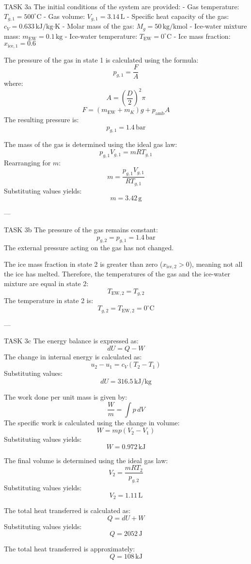 TASK 3a  
The initial conditions of the system are provided:  
- Gas temperature: \( T_{g,1} = 500^\circ\text{C} \)  
- Gas volume: \( V_{g,1} = 3.14 \, \text{L} \)  
- Specific heat capacity of the gas: \( c_V = 0.633 \, \text{kJ/kg·K} \)  
- Molar mass of the gas: \( M_g = 50 \, \text{kg/kmol} \)  
- Ice-water mixture mass: \( m_{\text{EW}} = 0.1 \, \text{kg} \)  
- Ice-water temperature: \( T_{\text{EW}} = 0^\circ\text{C} \)  
- Ice mass fraction: \( x_{\text{ice},1} = 0.6 \)  

The pressure of the gas in state 1 is calculated using the formula:  
\[
p_{g,1} = \frac{F}{A}
\]  
where:  
\[
A = \left( \frac{D}{2} \right)^2 \pi
\]  
\[
F = (m_{\text{EW}} + m_K) g + p_{\text{amb}} A
\]  
The resulting pressure is:  
\[
p_{g,1} = 1.4 \, \text{bar}
\]  

The mass of the gas is determined using the ideal gas law:  
\[
p_{g,1} V_{g,1} = m R T_{g,1}
\]  
Rearranging for \( m \):  
\[
m = \frac{p_{g,1} V_{g,1}}{R T_{g,1}}
\]  
Substituting values yields:  
\[
m = 3.42 \, \text{g}
\]  

---

TASK 3b  
The pressure of the gas remains constant:  
\[
p_{g,2} = p_{g,1} = 1.4 \, \text{bar}
\]  
The external pressure acting on the gas has not changed.  

The ice mass fraction in state 2 is greater than zero (\( x_{\text{ice},2} > 0 \)), meaning not all the ice has melted. Therefore, the temperatures of the gas and the ice-water mixture are equal in state 2:  
\[
T_{\text{EW},2} = T_{g,2}
\]  
The temperature in state 2 is:  
\[
T_{g,2} = T_{\text{EW},2} = 0^\circ\text{C}
\]  

---

TASK 3c  
The energy balance is expressed as:  
\[
dU = Q - W
\]  
The change in internal energy is calculated as:  
\[
u_2 - u_1 = c_V (T_2 - T_1)
\]  
Substituting values:  
\[
dU = 316.5 \, \text{kJ/kg}
\]  

The work done per unit mass is given by:  
\[
\frac{W}{m} = \int p \, dV
\]  
The specific work is calculated using the change in volume:  
\[
W = m p (V_2 - V_1)
\]  
Substituting values yields:  
\[
W = 0.972 \, \text{kJ}
\]  

The final volume is determined using the ideal gas law:  
\[
V_2 = \frac{m R T_2}{p_{g,2}}
\]  
Substituting values yields:  
\[
V_2 = 1.11 \, \text{L}
\]  

The total heat transferred is calculated as:  
\[
Q = dU + W
\]  
Substituting values yields:  
\[
Q = 2052 \, \text{J}
\]  

The total heat transferred is approximately:  
\[
Q = 108 \, \text{kJ}
\]  